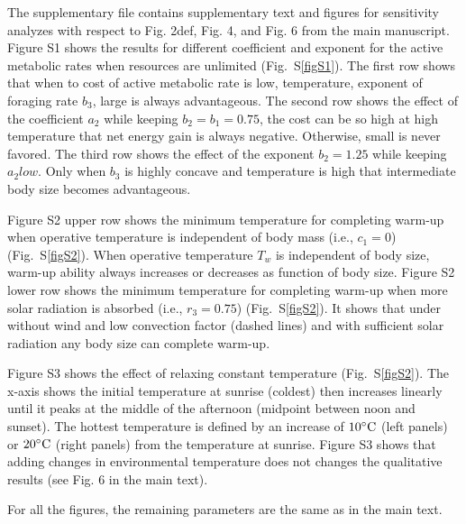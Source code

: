 \documentclass[12pt]{article}
\date{\vspace{-5ex}}
\begin{document}
\maketitle 

The supplementary file contains supplementary text and figures for sensitivity analyzes with respect to Fig. 2def, Fig. 4, and Fig. 6 from the main manuscript.
Figure S1  shows the results for different coefficient and exponent for the active metabolic  rates  when resources are unlimited (Fig.~S\ref{figS1}). 
The first row shows that when to cost of active metabolic rate is low, temperature, exponent of foraging rate $b_3$, large is always advantageous.
The second row shows the effect of the coefficient $a_2$ while keeping $b_2 = b_1 = 0.75$, the cost can be so high at high temperature that net energy gain is always negative.
Otherwise, small is never favored.
The third row shows the effect of the exponent $b_2 = 1.25$ while keeping $a_2 low$.
Only when $b_3$ is highly concave and temperature is high that intermediate body size becomes advantageous.

Figure S2  upper row shows the minimum temperature for completing warm-up when operative temperature is independent of body mass  (i.e., $c_1 = 0$) (Fig.~S\ref{figS2}).
When operative temperature $T_w$ is independent of body size, warm-up ability always increases or decreases as function of body size.
Figure S2 lower row shows the minimum temperature for completing warm-up when more solar radiation is absorbed (i.e., $r_3 = 0.75$) (Fig.~S\ref{figS2}).
It shows that under without wind and low convection factor (dashed lines) and with sufficient solar radiation any body size can complete warm-up.

Figure S3 shows the effect of relaxing constant temperature (Fig.~S\ref{figS2}).
The x-axis shows the initial temperature at sunrise (coldest) then increases linearly until it peaks at the middle of the afternoon (midpoint between noon and sunset). The hottest temperature is defined by an increase of $10 ^{\circ}\rm{C}$ (left panels) or $20 ^{\circ}\rm{C}$ (right panels) from the temperature at sunrise.
Figure S3 shows that adding changes in environmental temperature does not changes the qualitative results (see Fig. 6 in the main text).

For all the figures, the remaining parameters are the same as in the main text.
\end{document}

